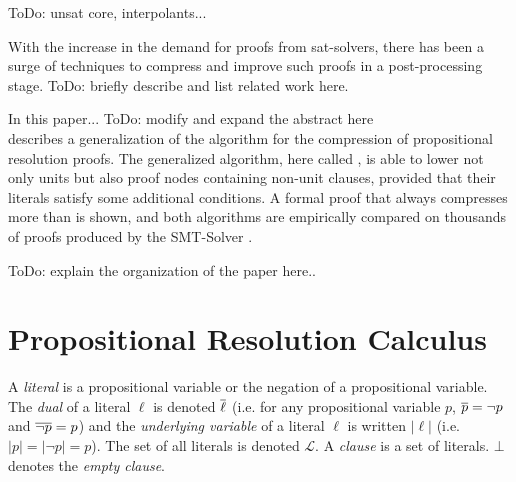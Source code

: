 \documentclass{llncs}
\begin{document}
ToDo: unsat core, interpolants...

With the increase in the demand for proofs from sat-solvers, there has been a surge of techniques to
compress and improve such proofs in a post-processing stage. ToDo: briefly describe and list related
work here.

In this paper...  ToDo: modify and expand the abstract here\\
 describes a generalization of the {\LowerUnits} algorithm \cite{LURPI} for the compression
of propositional resolution proofs. The generalized algorithm, here called {\LowerUnivalents}, is
able to lower not only units but also proof nodes containing non-unit clauses, provided that their
literals satisfy some additional conditions. A formal proof that {\LowerUnivalents} always
compresses more than {\LowerUnits} is shown, and both algorithms are empirically compared on
thousands of proofs produced by the SMT-Solver \veriT.

ToDo: explain the organization of the paper here..



\section{Propositional Resolution Calculus}

A \emph{literal} is a propositional variable or the negation of a propositional variable. The \emph{dual} of a literal $\ell$ is denoted
$\overline{\ell}$ (i.e. for any propositional variable $p$, $\overline{p} =
\neg p$ and $\overline{\neg p} = p$) and the \emph{underlying variable} of a literal
$\ell$ is written $|\ell|$ (i.e. $|p| = |\neg p| = p$). The set of all literals is denoted $\mathcal{L}$. A \emph{clause} is a set of literals. $\bot$ denotes the \emph{empty clause}.


\newcommand{\axiom}[1]{\hat{#1}}
\newcommand{\n}{v}
\newcommand{\raiz}[1]{\rho(#1)}
\end{document}

